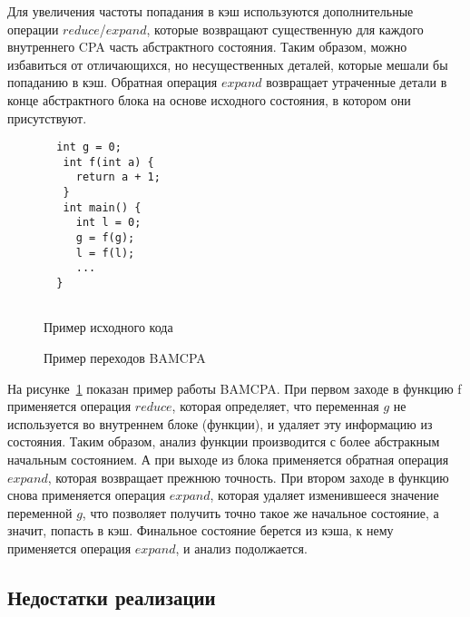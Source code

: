 Для увеличения частоты попадания в кэш используются дополнительные операции $reduce$/$expand$, которые возвращают существенную для каждого внутреннего CPA часть абстрактного состояния.
Таким образом, можно избавиться от отличающихся, но несущественных деталей, которые мешали бы попаданию в кэш.
Обратная операция $expand$ возвращает утраченные детали в конце абстрактного блока на основе исходного состояния, в котором они присутствуют.

\begin{figure}[h]
\begin{minipage}[h]{0.3\textwidth}
\begin{verbatim}
  int g = 0;
   int f(int a) {
     return a + 1;
   }
   int main() {
     int l = 0;
     g = f(g);
     l = f(l);
     ...
  }
  
\end{verbatim}
\caption{Пример исходного кода}
\label{BAMCodeExample}
\end{minipage}
\hfill
\begin{minipage}{0.6\textwidth}
    \caption{Пример переходов BAMCPA}
    \label{img:BAMCPA}
\end{minipage}
\end{figure}

На рисунке~\ref{img:BAMCPA} показан пример работы BAMCPA.
При первом заходе в функцию f применяется операция $reduce$, которая определяет, что переменная $g$ не используется во внутреннем блоке (функции), и удаляет эту информацию из состояния. 
Таким образом, анализ функции производится с более абстракным начальным состоянием.
А при выходе из блока применяется обратная операция $expand$, которая возвращает прежнюю точность.
При втором заходе в функцию снова применяется операция $expand$, которая удаляет изменившееся значение переменной $g$, что позволяет получить точно такое же начальное состояние, а значит, попасть в кэш. 
Финальное состояние берется из кэша, к нему применяется операция $expand$, и анализ подолжается.

\subsection{Недостатки реализации}


